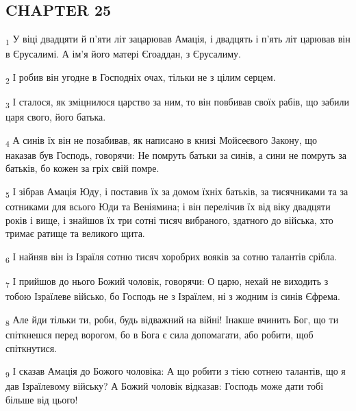 \subsection{CHAPTER 25}
\begin{tcolorbox}
\textsubscript{1} У віці двадцяти й п'яти літ зацарював Амація, і двадцять і п'ять літ царював він в Єрусалимі. А ім'я його матері Єгоаддан, з Єрусалиму.
\end{tcolorbox}
\begin{tcolorbox}
\textsubscript{2} І робив він угодне в Господніх очах, тільки не з цілим серцем.
\end{tcolorbox}
\begin{tcolorbox}
\textsubscript{3} І сталося, як зміцнилося царство за ним, то він повбивав своїх рабів, що забили царя свого, його батька.
\end{tcolorbox}
\begin{tcolorbox}
\textsubscript{4} А синів їх він не позабивав, як написано в книзі Мойсеєвого Закону, що наказав був Господь, говорячи: Не помруть батьки за синів, а сини не помруть за батьків, бо кожен за гріх свій помре.
\end{tcolorbox}
\begin{tcolorbox}
\textsubscript{5} І зібрав Амація Юду, і поставив їх за домом їхніх батьків, за тисячниками та за сотниками для всього Юди та Веніямина; і він перелічив їх від віку двадцяти років і вище, і знайшов їх три сотні тисяч вибраного, здатного до війська, хто тримає ратище та великого щита.
\end{tcolorbox}
\begin{tcolorbox}
\textsubscript{6} І найняв він із Ізраїля сотню тисяч хоробрих вояків за сотню талантів срібла.
\end{tcolorbox}
\begin{tcolorbox}
\textsubscript{7} І прийшов до нього Божий чоловік, говорячи: О царю, нехай не виходить з тобою Ізраїлеве військо, бо Господь не з Ізраїлем, ні з жодним із синів Єфрема.
\end{tcolorbox}
\begin{tcolorbox}
\textsubscript{8} Але йди тільки ти, роби, будь відважний на війні! Інакше вчинить Бог, що ти спіткнешся перед ворогом, бо в Бога є сила допомагати, або робити, щоб спіткнутися.
\end{tcolorbox}
\begin{tcolorbox}
\textsubscript{9} І сказав Амація до Божого чоловіка: А що робити з тією сотнею талантів, що я дав Ізраїлевому війську? А Божий чоловік відказав: Господь може дати тобі більше від цього!
\end{tcolorbox}
